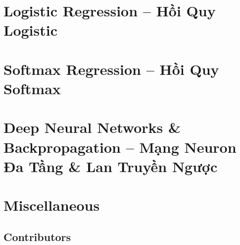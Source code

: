 \documentclass{article}
\begin{document}
\section{Logistic Regression -- Hồi Quy Logistic}


\section{Softmax Regression -- Hồi Quy Softmax}


\section{Deep Neural Networks \& Backpropagation -- Mạng Neuron Đa Tầng \& Lan Truyền Ngược}


\section{Miscellaneous}

\subsection{Contributors}


\printbibliography[heading=bibintoc]
	
\end{document}
